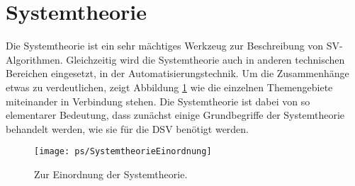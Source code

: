 \section{Systemtheorie}
Die Systemtheorie ist ein sehr mächtiges Werkzeug zur Beschreibung von SV-Algorithmen.
Gleichzeitig wird die Systemtheorie auch in anderen technischen Bereichen eingesetzt, \zB
in der Automatisierungstechnik. Um die Zusammenhänge etwas zu verdeutlichen, zeigt
Abbildung \ref{pic:SystemtheorieEinordnung} wie die einzelnen Themengebiete
miteinander in Verbindung stehen. Die Systemtheorie ist dabei von so elementarer Bedeutung,
dass zunächst einige Grundbegriffe der Systemtheorie behandelt werden, wie sie für die DSV
benötigt werden.

\begin{figure}[H]
\begin{center}
\texttt{[image: ps/SystemtheorieEinordnung]}
\caption{\label{pic:SystemtheorieEinordnung} Zur Einordnung der Systemtheorie.}
\end{center}
\end{figure}
